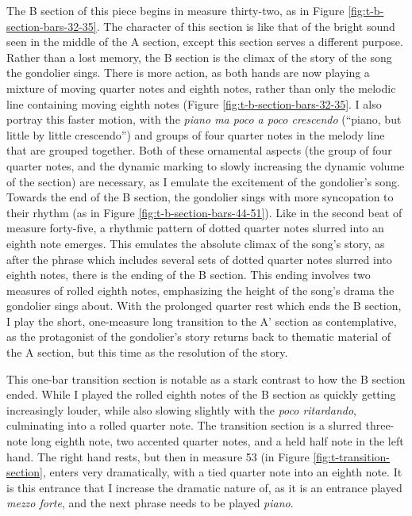 The B section of this piece begins in measure thirty-two, as in Figure \ref{fig:t-b-section-bars-32-35}\autocite{Henle_2002}. The character of this section is like that of the bright sound seen in the middle of the A section, except this section serves a different purpose. Rather than a lost memory, the B section is the climax of the story of the song the gondolier sings. There is more action, as both hands are now playing a mixture of moving quarter notes and eighth notes, rather than only the melodic line containing moving eighth notes (Figure \ref{fig:t-b-section-bars-32-35}\autocite{Henle_2002}. I also portray this faster motion, with the \textit{piano ma poco a poco crescendo} (``piano, but little by little crescendo'') and groups of four quarter notes in the melody line that are grouped together. Both of these ornamental aspects (the group of four quarter notes, and the dynamic marking to slowly increasing the dynamic volume of the section) are necessary, as I emulate the excitement of the gondolier's song. Towards the end of the B section, the gondolier sings with more syncopation to their rhythm (as in Figure \ref{fig:t-b-section-bars-44-51}\autocite{Henle_2002}). Like in the second beat of measure forty-five, a rhythmic pattern of dotted quarter notes slurred into an eighth note emerges. This emulates the absolute climax of the song's story, as after the phrase which includes several sets of dotted quarter notes slurred into eighth notes, there is the ending of the B section. This ending involves two measures of rolled eighth notes, emphasizing the height of the song's drama the gondolier sings about. With the prolonged quarter rest which ends the B section, I play the short, one-measure long transition to the A' section as contemplative, as the protagonist of the gondolier's story returns back to thematic material of the A section, but this time as the resolution of the story.

This one-bar transition section is notable as a stark contrast to how the B section ended. While I played the rolled eighth notes of the B section as quickly getting increasingly louder, while also slowing slightly with the \textit{poco ritardando}, culminating into a rolled quarter note. The transition section is a slurred three-note long eighth note, two accented quarter notes, and a held half note in the left hand. The right hand rests, but then in measure 53 (in Figure \ref{fig:t-transition-section}\autocite{Henle_2002}, enters very dramatically, with a tied quarter note into an eighth note. It is this entrance that I increase the dramatic nature of, as it is an entrance played \textit{mezzo forte}, and the next phrase needs to be played \textit{piano}.

